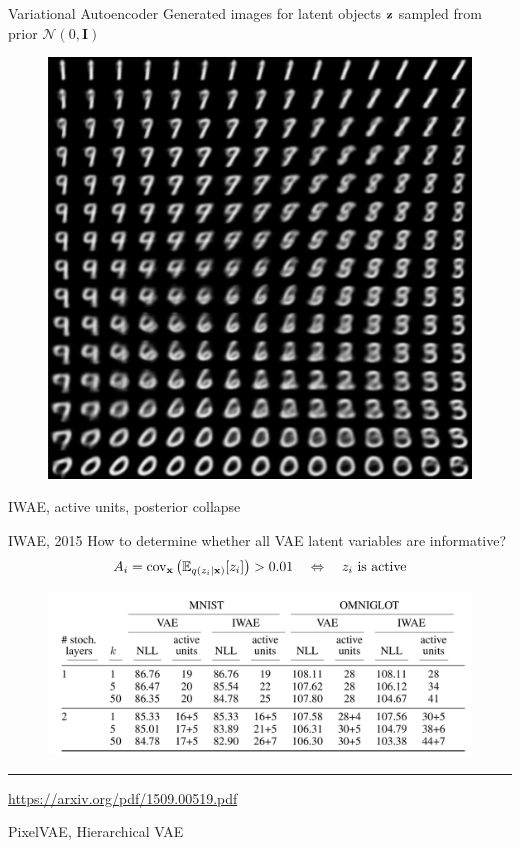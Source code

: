 \begin{frame}{Variational Autoencoder}
	Generated images for latent objects $\mathbf{z}$ sampled from prior $\mathcal{N}(0, \mathbf{I})$
	\begin{figure}[h]
		\centering
		\includegraphics[width=.5\linewidth]{figs/vae_0.png}
	\end{figure}
\end{frame}
\begin{frame}{IWAE, active units, posterior collapse}
\end{frame}
\begin{frame}{IWAE, 2015}
How to determine whether all VAE latent variables are informative?
\[
A_{i} = \text{cov}_{\mathbf{x}} \left( \mathbb{E}_{q(z_i | \mathbf{x})} [z_i] \right) > 0.01 \quad \Leftrightarrow \quad z_i \text{ is active}
\]
\begin{figure}
	\centering
	\includegraphics[width=\linewidth]{figs/IWAE_3.png}
\end{figure}
\vfill
\hrule\medskip
{\scriptsize \href{https://arxiv.org/pdf/1509.00519.pdf}{https://arxiv.org/pdf/1509.00519.pdf}}
\end{frame}
\begin{frame}{PixelVAE, Hierarchical VAE}
\end{frame}
